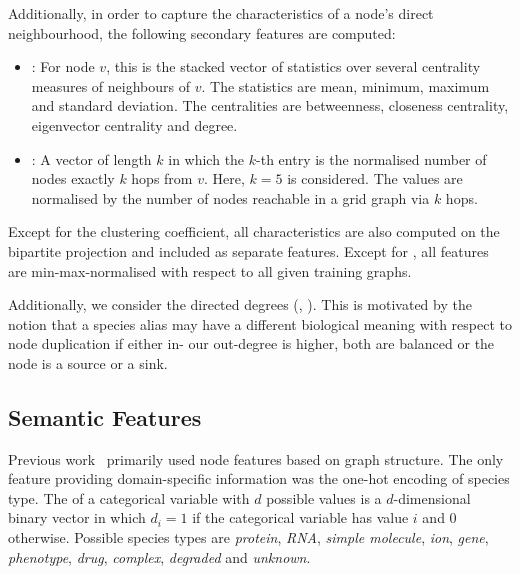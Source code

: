 \documentclass[
	fontsize=10pt, %
	twoside=true, %
	secnumdepth=1, %
  toc=indentunnumbered %
]{kaobook}
\begin{document}
Additionally, in order to capture the characteristics of a node's direct
neighbourhood, the following secondary features are computed:
\begin{itemize}
\item {}: For node $v$, this is the stacked
  vector of statistics over several centrality measures of neighbours of $v$.
  The statistics are mean, minimum, maximum and standard deviation. The
  centralities are betweenness, closeness centrality, eigenvector centrality and degree.
\item {}: A vector of length $k$ in which the $k$-th
  entry is the normalised number of nodes exactly $k$ hops from $v$. Here, $k=5$
  is considered. The values are normalised by the number of nodes reachable in a
  grid graph via $k$ hops.
\end{itemize}

Except for the clustering coefficient, all characteristics are also
computed on the bipartite projection and included as separate features.
Except for , all features are min-max-normalised
with respect to all given training graphs.


Additionally, we consider the directed degrees (,
). This is motivated by the notion that a species alias may
have a different biological meaning with respect to node duplication if either in- our
out-degree is higher, both are balanced or the node is a source or a sink.




\subsection{Semantic Features}
\label{sec:semantic-features}

Previous work~\cite{nielsen_MachineLearningSupport_2019} primarily used node
features based on graph structure. The only feature providing domain-specific
information was the one-hot encoding of species type. The 
of a categorical variable with $d$ possible values is a $d$-dimensional binary
vector in which $d_i = 1$ if the categorical variable has value $i$ and $0$
otherwise. Possible species types are \textit{protein}, \textit{RNA},
\textit{simple molecule}, \textit{ion}, \textit{gene}, \textit{phenotype},
\textit{drug}, \textit{complex}, \textit{degraded} and \textit{unknown}.
\end{document}
